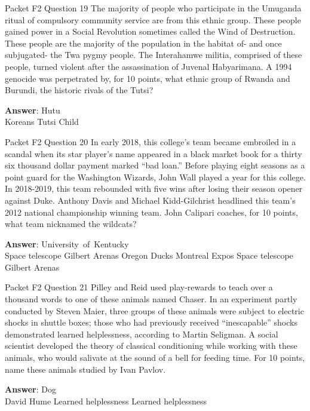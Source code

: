 \begin{frame}{Packet F2 Question 19}
The majority of people who participate in the Umuganda ritual of compulsory community service are from this ethnic group. These people gained power in a Social Revolution sometimes called the Wind of Destruction. These people are the majority of the population in the habitat of- and once subjugated- the   Twa pygmy people. The Interahamwe militia, comprised of these people, turned violent after the assassination of Juvenal Habyarimana. A 1994   genocide was perpetrated by, for 10 points, what ethnic group of Rwanda and Burundi,   the historic rivals of the Tutsi?    

\textbf{Answer}: Hutu\\
 Koreans
 Tutsi
 Child
\end{frame}

\begin{frame}{Packet F2 Question 20}
In early 2018, this college’s   team became embroiled in a scandal when its star player’s name appeared in a black market book for a thirty six thousand dollar payment marked “bad loan.” Before playing eight seasons as a point guard for the Washington Wizards, John   Wall played a year for this college. In 2018-2019, this team rebounded with five wins after losing their season opener against Duke. Anthony Davis and Michael Kidd-Gilchrist headlined this team’s 2012 national championship winning team. John Calipari coaches, for 10 points, what team nicknamed the wildcats?        

\textbf{Answer}: University\ of\ Kentucky\\
 Space telescope
 Gilbert Arenas
 Oregon Ducks
 Montreal Expos
 Space telescope
 Gilbert Arenas
\end{frame}

\begin{frame}{Packet F2 Question 21}
Pilley and Reid used play-rewards to teach over a thousand words to one of these animals   named Chaser.     In an experiment partly conducted by Steven Maier, three groups of these animals were subject to electric shocks in shuttle boxes; those who had previously received “inescapable” shocks demonstrated   learned helplessness, according to Martin Seligman. A social scientist developed the theory of classical conditioning while working with these animals, who would salivate at the sound   of a bell for feeding time. For 10 points, name these animals studied by Ivan Pavlov.  

\textbf{Answer}: Dog\\
 David Hume
 Learned helplessness
 Learned helplessness
\end{frame}

